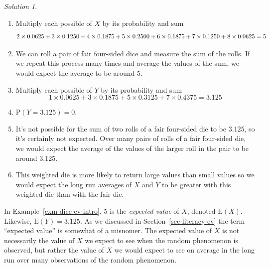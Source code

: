\documentclass[
  letterpaper,
  DIV=11,
  numbers=noendperiod]{scrreprt}
\providecommand{\tightlist}{%
  \setlength{\itemsep}{0pt}\setlength{\parskip}{0pt}}
\theoremstyle{plain}
\theoremstyle{definition}
\theoremstyle{definition}
\theoremstyle{definition}
\theoremstyle{remark}
\newtheorem{refsolution}{Solution}[chapter]
\begin{document}
\begin{tcolorbox}[enhanced jigsaw, opacityback=0, rightrule=.15mm, coltitle=black, colframe=quarto-callout-tip-color-frame, toprule=.15mm, colbacktitle=quarto-callout-tip-color!10!white, opacitybacktitle=0.6, left=2mm, toptitle=1mm, breakable, title={Solution (click to expand)}, bottomtitle=1mm, colback=white, leftrule=.75mm, titlerule=0mm, arc=.35mm, bottomrule=.15mm]

\begin{refsolution}
\leavevmode

\begin{enumerate}
\def\labelenumi{\arabic{enumi}.}
\tightlist
\item
  Multiply each possible of \(X\) by its probability and sum \[
  \small{
  2\times 0.0625 + 3 \times 0.1250 + 4 \times 0.1875 + 5 \times 0.2500 + 6 \times 0.1875 + 7 \times 0.1250 + 8 \times 0.0625 = 5
  }
  \]
\item
  We can roll a pair of fair four-sided dice and measure the sum of the
  rolls. If we repeat this process many times and average the values of
  the sum, we would expect the average to be around 5.
\item
  Multiply each possible of \(Y\) by its probability and sum \[
  1\times 0.0625 + 3 \times 0.1875 + 5 \times 0.3125 + 7 \times 0.4375  = 3.125
  \]
\item
  \(\textrm{P}(Y = 3.125) = 0\).
\item
  It's not possible for the sum of two rolls of a fair four-sided die to
  be 3.125, so it's certainly not expected. Over many pairs of rolls of
  a fair four-sided die, we would expect the average of the values of
  the larger roll in the pair to be around 3.125.
\item
  This weighted die is more likely to return large values than small
  values so we would expect the long run averages of \(X\) and \(Y\) to
  be greater with this weighted die than with the fair die.
\end{enumerate}

\label{sol-dice-ev-intro}

\end{refsolution}

\end{tcolorbox}

In Example~\ref{exm-dice-ev-intro}, 5 is the \emph{expected value} of
\(X\), denoted \(\textrm{E}(X)\). Likewise, \(\textrm{E}(Y) = 3.125\).
As we discussed in Section~\ref{sec-literacy-ev} the term ``expected
value'' is somewhat of a misnomer. The expected value of \(X\) is not
necessarily the value of \(X\) we expect to see when the random
phenomenon is observed, but rather the value of \(X\) we would expect to
see on average in the long run over many observations of the random
phenomenon.
\end{document}
